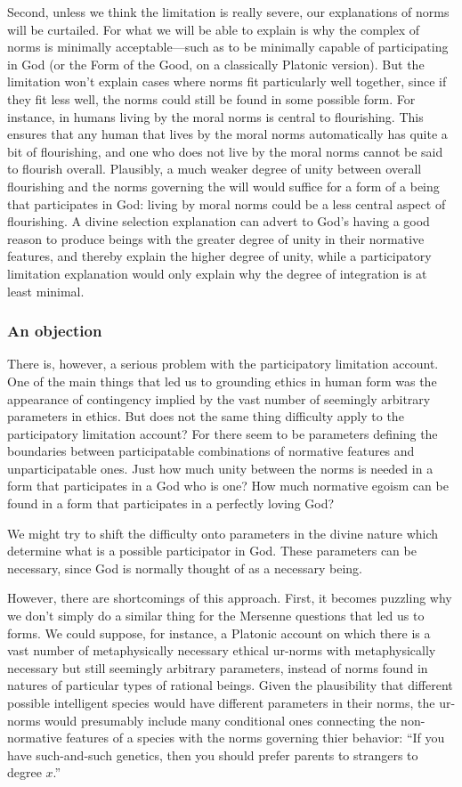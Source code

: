 Second, unless we think the limitation is really severe, our explanations of norms will be curtailed. For what we will be able to explain
is why the complex of norms is minimally acceptable---such as to be minimally capable of participating in God (or the Form of the Good,
on a classically Platonic version). But the limitation won't explain cases where norms fit particularly well together, since if they 
fit less well, the norms could still be found in some possible form. For instance, in humans living by the moral norms is central to  
flourishing. This ensures that any human that lives by the moral norms automatically has quite a bit of flourishing, and one who 
does not live by the moral norms cannot be said to flourish overall. Plausibly, a much weaker degree of unity between overall flourishing
and the norms governing the will would suffice for a form of a being that participates in God: living by moral norms could be a less
central aspect of flourishing. A divine selection explanation can advert to God's having a good reason to produce beings with the greater 
degree of unity in their normative features, and thereby explain the higher degree of unity, while a participatory limitation explanation
would only explain why the degree of integration is at least minimal.

\subsubsection{An objection}\label{sec:limited-pl}
There is, however, a serious problem with the participatory limitation account. One of the main things that led us to grounding ethics
in human form was the appearance of contingency implied by the vast number of seemingly arbitrary parameters in ethics. But does not 
the same thing difficulty apply to the participatory limitation account? For there seem to be parameters defining the boundaries between
participatable combinations of normative features and unparticipatable ones. Just how much unity between the norms is needed in a form
that participates in a God who is one? How much normative egoism can be found in a form that participates in a perfectly loving God?

We might try to shift the difficulty onto parameters in the divine nature which determine what is a possible participator in God.
These parameters can be necessary, since God is normally thought of as a necessary being. 

However, there are shortcomings of this approach. First, it becomes puzzling why we don't simply do a similar thing for the Mersenne questions that 
led us to forms. We could suppose, for instance, a Platonic account on which there is a vast number of metaphysically necessary ethical ur-norms
with metaphysically necessary but still seemingly arbitrary parameters, instead of norms found in natures of particular types of 
rational beings. Given the plausibility that different possible intelligent species would have different parameters in their norms, 
the ur-norms would presumably include many conditional ones connecting the non-normative features of a species with the norms governing
thier behavior: ``If you have such-and-such genetics, then you should prefer parents to strangers to degree $x$.'' 

